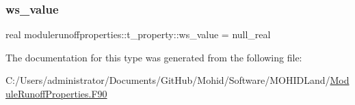 \mbox{\label{structmodulerunoffproperties_1_1t__property_ac9a057648d2b3fd2224929dbcc72fb5d}} 
\subsubsection{\texorpdfstring{ws\+\_\+value}{ws\_value}}
{\footnotesize\ttfamily real modulerunoffproperties\+::t\+\_\+property\+::ws\+\_\+value = null\+\_\+real\hspace{0.3cm}{\ttfamily [private]}}



The documentation for this type was generated from the following file\+:\begin{DoxyCompactItemize}
\item 
C\+:/\+Users/administrator/\+Documents/\+Git\+Hub/\+Mohid/\+Software/\+M\+O\+H\+I\+D\+Land/\mbox{\hyperlink{_module_runoff_properties_8_f90}{Module\+Runoff\+Properties.\+F90}}\end{DoxyCompactItemize}
